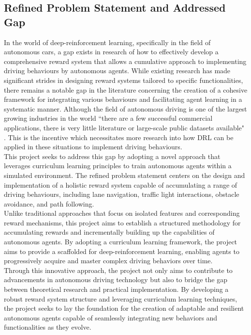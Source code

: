 \documentclass{article}
\begin{document}
\subsection{Refined Problem Statement and Addressed Gap}
In the world of deep-reinforcement learning, specifically in the field of autonomous cars, a gap exists in research of how to effectively develop a comprehensive reward system that allows a cumulative approach to implementing driving behaviours by autonomous agents. While existing research has made significant strides in designing reward systems tailored to specific functionalities, there remains a notable gap in the literature concerning the creation of a cohesive framework for integrating various behaviours and facilitating agent learning in a systematic manner. Although the field of autonomous driving is one of the largest growing industries in the world ``there are a few successful commercial applications, there is very little literature or large-scale public datasets available" \cite{Deep-learning-for-AI-driving}. This is the incentive which necessitates more research into how DRL can be applied in these situations to implement driving behaviours. \\

This project seeks to address this gap by adopting a novel approach that leverages curriculum learning principles to train autonomous agents within a simulated environment. The refined problem statement centers on the design and implementation of a holistic reward system capable of accumulating a range of driving behaviours, including lane navigation, traffic light interactions, obstacle avoidance, and path following. \\

Unlike traditional approaches that focus on isolated features and corresponding reward mechanisms, this project aims to establish a structured methodology for accumulating rewards and incrementally building up the capabilities of autonomous agents. By adopting a curriculum learning framework, the project aims to provide a scaffolded for deep-reinforcement learning, enabling agents to progressively acquire and master complex driving behaviors over time.\\

Through this innovative approach, the project not only aims to contribute to advancements in autonomous driving technology but also to bridge the gap between theoretical research and practical implementation. By developing a robust reward system structure and leveraging curriculum learning techniques, the project seeks to lay the foundation for the creation of adaptable and resilient autonomous agents capable of seamlessly integrating new behaviors and functionalities as they evolve.
\end{document}
